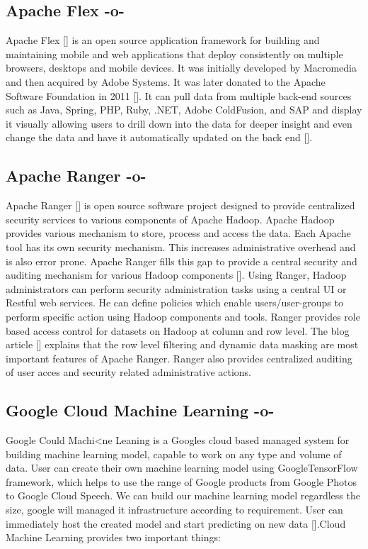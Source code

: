 \subsection{Apache Flex -o-}

Apache Flex [\cite{www-flex}] is an open source application framework
for building and maintaining mobile and web applications that deploy
consistently on multiple browsers, desktops and mobile devices. It was
initially developed by Macromedia and then acquired by Adobe
Systems. It was later donated to the Apache Software Foundation in
2011 [\cite{blog-flex}]. It can pull data from multiple back-end sources
such as Java, Spring, PHP, Ruby, .NET, Adobe ColdFusion, and SAP and
display it visually allowing users to drill down into the data for
deeper insight and even change the data and have it automatically
updated on the back end [\cite{wiki-flex}].

\subsection{Apache Ranger -o-}

Apache Ranger [\cite{www-apache-ranger}] is open source software project
designed to provide centralized security services to various
components of Apache Hadoop. Apache Hadoop provides various mechanism
to store, process and access the data. Each Apache tool has its own
security mechanism. This increases administrative overhead and is also
error prone.  Apache Ranger fills this gap to provide a central
security and auditing mechanism for various Hadoop
components [\cite{www-ranger-architecture}]. Using Ranger, Hadoop
administrators can perform security administration tasks using a
central UI or Restful web services. He can define policies which
enable users/user-groups to perform specific action using Hadoop
components and tools. Ranger provides role based access control for
datasets on Hadoop at column and row level.  The blog
article [\cite{www-ranger-key-features}] explains that the row level
filtering and dynamic data masking are most important features of
Apache Ranger. Ranger also provides centralized auditing of user acces
and security related administrative actions.
     
\subsection{Google Cloud Machine Learning -o-}
     
Google Could Machi<ne Leaning is a Googles cloud based managed system
for building machine learning model, capable to work on any type and
volume of data. User can create their own machine learning model using
GoogleTensorFlow framework, which helps to use the range of Google
products from Google Photos to Google Cloud Speech.  We can build our
machine learning model regardless the size, google will managed it
infrastructure according to requirement. User can immediately host the
created model and start predicting on new
data [\cite{www-googlecloudmachinelearning}].Cloud Machine Learning
provides two important things:
     
